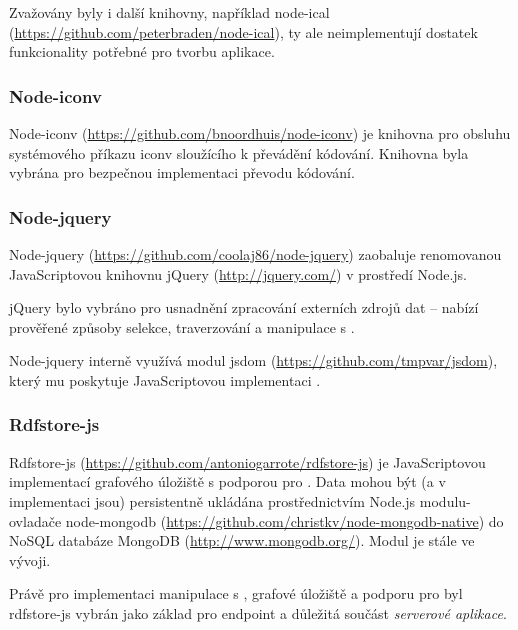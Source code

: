 Zvažovány byly i další knihovny, například node-ical (\url{https://github.com/peterbraden/node-ical}), ty ale neimplementují dostatek funkcionality potřebné pro tvorbu aplikace.

\subsubsection{Node-iconv}
Node-iconv (\url{https://github.com/bnoordhuis/node-iconv}) je knihovna pro obsluhu systémového příkazu iconv sloužícího k převádění kódování. Knihovna byla vybrána pro bezpečnou implementaci převodu kódování.

\subsubsection{Node-jquery}
Node-jquery (\url{https://github.com/coolaj86/node-jquery}) zaobaluje renomovanou JavaScriptovou knihovnu jQuery (\url{http://jquery.com/}) v prostředí Node.js.

jQuery bylo vybráno pro usnadnění zpracování externích zdrojů dat -- nabízí prověřené způsoby selekce, traverzování a manipulace s .

Node-jquery interně využívá modul jsdom (\url{https://github.com/tmpvar/jsdom}), který mu poskytuje JavaScriptovou implementaci .

\subsubsection{Rdfstore-js}
\label{sec:rdfstore}
Rdfstore-js (\url{https://github.com/antoniogarrote/rdfstore-js}) je JavaScriptovou implementací  grafového úložiště s podporou pro . Data mohou být (a v implementaci  jsou) persistentně ukládána prostřednictvím Node.js modulu-ovladače node-mongodb (\url{https://github.com/christkv/node-mongodb-native}) do NoSQL databáze MongoDB (\url{http://www.mongodb.org/}). Modul je stále ve vývoji.

Právě pro implementaci manipulace s , grafové úložiště a podporu pro  byl rdfstore-js vybrán jako základ pro  endpoint a důležitá součást \textit{serverové aplikace}.



